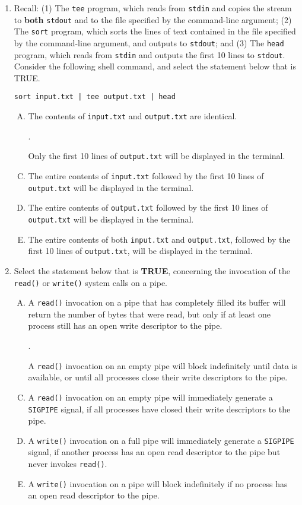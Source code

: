 \documentclass[11pt]{article}
\begin{document}
\begin{enumerate}[{1}.1]
	\newpage
	\item Recall: (1) The \Verb*|tee| program, which reads from \Verb|stdin| and copies the stream to \textbf{both} \Verb*|stdout| and to the file specified by the command-line argument; (2) The \Verb*|sort| program, which sorts the lines of text contained in the file specified by the command-line argument, and outputs to \Verb|stdout|; and (3) The \Verb*|head| program, which reads from \Verb|stdin| and outputs the first 10 lines to \Verb|stdout|. Consider the following shell command, and select the statement below that is TRUE.
	\begin{Verbatim}
sort input.txt | tee output.txt | head
	\end{Verbatim}
		\begin{enumerate}[A.]
			\item The contents of \Verb|input.txt| and \Verb|output.txt| are identical.
			\item[\textcolor{correct}{\addtocounter{enumii}{1}\Alph{enumii}.}] \textcolor{correct}{Only the first 10 lines of \Verb|output.txt| will be displayed in the terminal.}
			\item  The entire contents of \Verb|input.txt| followed by the first 10 lines of \Verb|output.txt| will be displayed in the terminal.
			\item  The entire contents of \Verb|output.txt| followed by the first 10 lines of \Verb|output.txt| will be displayed in the terminal.
			\item  The entire contents of both \Verb|input.txt| and \Verb|output.txt|, followed by the first 10 lines of \Verb|output.txt|, will be displayed in the terminal.
		\end{enumerate}

	\item Select the statement below that is \textbf{TRUE}, concerning the invocation of the \Verb|read()| or \Verb|write()| system calls on a pipe.
		\begin{enumerate}[A.]
			\item A \Verb|read()| invocation on a pipe that has completely filled its buffer will return the number of bytes that were read, but only if at least one process still has an open write descriptor to the pipe.
			\item[\textcolor{correct}{\addtocounter{enumii}{1}\Alph{enumii}.}] \textcolor{correct}{A \Verb|read()| invocation on an empty pipe will block indefinitely until data is available, or until all processes close their write descriptors to the pipe.}
			\item A \Verb|read()| invocation on an empty pipe will immediately generate a \Verb|SIGPIPE| signal, if all processes have closed their write descriptors to the pipe.
			\item A \Verb|write()| invocation on a full pipe will immediately generate a \Verb|SIGPIPE| signal, if another process has an open read descriptor to the pipe but never invokes \Verb|read()|.
			\item A \Verb|write()| invocation on a pipe will block indefinitely if no process has an open read descriptor to the pipe.
		\end{enumerate}


\end{enumerate}
\end{document}
